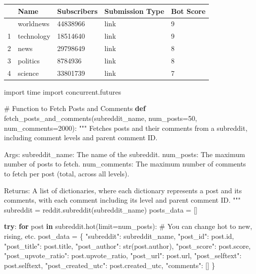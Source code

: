 \documentclass[
  12pt,
  letterpaper,
  DIV=11,
  numbers=noendperiod]{scrartcl}
\newenvironment{Shaded}{\begin{snugshade}}{\end{snugshade}}
\newcommand{\BuiltInTok}[1]{\textcolor[rgb]{0.00,0.23,0.31}{#1}}
\newcommand{\CommentTok}[1]{\textcolor[rgb]{0.37,0.37,0.37}{#1}}
\newcommand{\ControlFlowTok}[1]{\textcolor[rgb]{0.00,0.23,0.31}{\textbf{#1}}}
\newcommand{\DecValTok}[1]{\textcolor[rgb]{0.68,0.00,0.00}{#1}}
\newcommand{\ImportTok}[1]{\textcolor[rgb]{0.00,0.46,0.62}{#1}}
\newcommand{\KeywordTok}[1]{\textcolor[rgb]{0.00,0.23,0.31}{\textbf{#1}}}
\newcommand{\NormalTok}[1]{\textcolor[rgb]{0.00,0.23,0.31}{#1}}
\newcommand{\OperatorTok}[1]{\textcolor[rgb]{0.37,0.37,0.37}{#1}}
\newcommand{\StringTok}[1]{\textcolor[rgb]{0.13,0.47,0.30}{#1}}
\begin{document}
\begin{longtable}[]{@{}lllll@{}}
\toprule\noalign{}
& Name & Subscribers & Submission Type & Bot Score \\
\midrule\noalign{}
\endhead
\bottomrule\noalign{}
\endlastfoot
0 & worldnews & 44838966 & link & 9 \\
1 & technology & 18514640 & link & 9 \\
2 & news & 29798649 & link & 8 \\
3 & politics & 8784936 & link & 8 \\
4 & science & 33801739 & link & 7 \\
\end{longtable}

\begin{Shaded}
\begin{Highlighting}[]
\ImportTok{import}\NormalTok{ time}
\ImportTok{import}\NormalTok{ concurrent.futures}

\CommentTok{\# Function to Fetch Posts and Comments}
\KeywordTok{def}\NormalTok{ fetch\_posts\_and\_comments(subreddit\_name, num\_posts}\OperatorTok{=}\DecValTok{50}\NormalTok{, num\_comments}\OperatorTok{=}\DecValTok{2000}\NormalTok{):}
    \CommentTok{"""}
\CommentTok{    Fetches posts and their comments from a subreddit, including comment levels and parent comment ID.}

\CommentTok{    Args:}
\CommentTok{        subreddit\_name: The name of the subreddit.}
\CommentTok{        num\_posts: The maximum number of posts to fetch.}
\CommentTok{        num\_comments: The maximum number of comments to fetch per post (total, across all levels).}

\CommentTok{    Returns:}
\CommentTok{        A list of dictionaries, where each dictionary represents a post and its comments,}
\CommentTok{        with each comment including its level and parent comment ID.}
\CommentTok{    """}
\NormalTok{    subreddit }\OperatorTok{=}\NormalTok{ reddit.subreddit(subreddit\_name)}
\NormalTok{    posts\_data }\OperatorTok{=}\NormalTok{ []}

    \ControlFlowTok{try}\NormalTok{:}
        \ControlFlowTok{for}\NormalTok{ post }\KeywordTok{in}\NormalTok{ subreddit.hot(limit}\OperatorTok{=}\NormalTok{num\_posts):  }\CommentTok{\# You can change \textquotesingle{}hot\textquotesingle{} to \textquotesingle{}new\textquotesingle{}, \textquotesingle{}rising\textquotesingle{}, etc.}
\NormalTok{            post\_data }\OperatorTok{=}\NormalTok{ \{}
                \StringTok{"subreddit"}\NormalTok{: subreddit\_name,}
                \StringTok{"post\_id"}\NormalTok{: post.}\BuiltInTok{id}\NormalTok{,}
                \StringTok{"post\_title"}\NormalTok{: post.title,}
                \StringTok{"post\_author"}\NormalTok{: }\BuiltInTok{str}\NormalTok{(post.author),}
                \StringTok{"post\_score"}\NormalTok{: post.score,}
                \StringTok{"post\_upvote\_ratio"}\NormalTok{: post.upvote\_ratio,}
                \StringTok{"post\_url"}\NormalTok{: post.url,}
                \StringTok{"post\_selftext"}\NormalTok{: post.selftext,}
                \StringTok{"post\_created\_utc"}\NormalTok{: post.created\_utc,}
                \StringTok{"comments"}\NormalTok{: []}
\NormalTok{            \}}


\end{Highlighting}
\end{Shaded}
\end{document}
